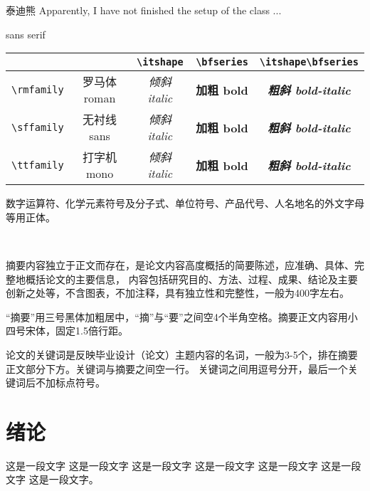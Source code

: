 \documentclass[fontset = mac ms]{seuthesis2024b}
\begin{document}
  泰迪熊 Apparently, I have not finished the setup of the class ...
  
  \textsf{sans serif}

  \begin{center}
    \begin{tabular}{c|cccc}
      & & \verb|\itshape| & \verb|\bfseries| & \verb|\itshape\bfseries| \\
      \hline
      \verb|\rmfamily| & \rmfamily 罗马体 roman & \rmfamily\itshape 倾斜 italic & \rmfamily\bfseries 加粗 bold & \rmfamily\itshape\bfseries 粗斜 bold-italic \\
      \verb|\sffamily| & \sffamily 无衬线 sans  & \sffamily\itshape 倾斜 italic & \sffamily\bfseries 加粗 bold & \sffamily\itshape\bfseries 粗斜 bold-italic \\
      \verb|\ttfamily| & \ttfamily 打字机 mono  & \ttfamily\itshape 倾斜 italic & \ttfamily\bfseries 加粗 bold & \ttfamily\itshape\bfseries 粗斜 bold-italic
    \end{tabular}
  \end{center}

  \clearpage

  \noindent
  数字运算符、化学元素符号及分子式、单位符号、产品代号、人名地名的外文字母等用正体。

  ~

  \clearpage

  摘要内容独立于正文而存在，是论文内容高度概括的简要陈述，应准确、具体、完整地概括论文的主要信息，
  内容包括研究目的、方法、过程、成果、结论及主要创新之处等，不含图表，不加注释，具有独立性和完整性，一般为400字左右。

  “摘要”用三号黑体加粗居中，“摘”与“要”之间空4个半角空格。摘要正文内容用小四号宋体，固定1.5倍行距。
  
  论文的关键词是反映毕业设计（论文）主题内容的名词，一般为3-5个，排在摘要正文部分下方。关键词与摘要之间空一行。
  关键词之间用逗号分开，最后一个关键词后不加标点符号。

  \chapter{绪论}
    这是一段文字
    这是一段文字
    这是一段文字
    这是一段文字
    这是一段文字
    这是一段文字
    这是一段文字。




\end{document}
